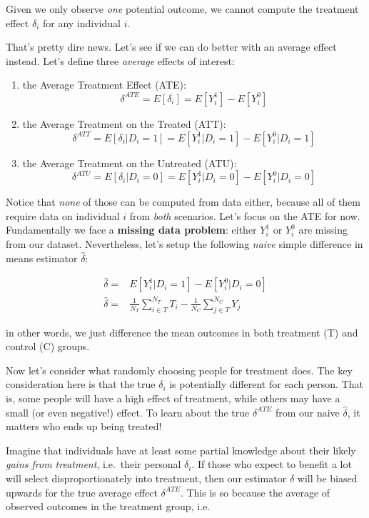 \documentclass[]{book}
\providecommand{\tightlist}{%
  \setlength{\itemsep}{0pt}\setlength{\parskip}{0pt}}
\newenvironment{warning}{\begin{tcolorbox}[colback=orange!5!white,colframe=orange]}{\end{tcolorbox}}
\begin{document}
\begin{warning}
Given we only observe \emph{one} potential outcome, we cannot compute
the treatment effect \(\delta_i\) for any individual \(i\).
\end{warning}

 That's pretty dire news. Let's see if we can do better with an average
effect instead. Let's define three \emph{average} effects of interest:

\begin{enumerate}
\def\labelenumi{\arabic{enumi}.}
\tightlist
\item
  the Average Treatment Effect (ATE):
  \[\delta^{ATE} = E[\delta_i] = E[Y_i^1] - E[Y_i^0]\]
\item
  the Average Treatment on the Treated (ATT):
  \[\delta^{ATT} = E[\delta_i|D_i = 1] = E[Y_i^1|D_i = 1] - E[Y_i^0|D_i = 1]\]
\item
  the Average Treatment on the Untreated (ATU):
  \[\delta^{ATU} = E[\delta_i|D_i = 0] = E[Y_i^1|D_i = 0] - E[Y_i^0|D_i = 0]\]
\end{enumerate}

Notice that \emph{none} of those can be computed from data either,
because all of them require data on individual \(i\) from \emph{both}
scenarios. Let's focus on the ATE for now. Fundamentally we face a
\textbf{missing data problem}: either \(Y_i^1\) or \(Y_i^0\) are missing
from our dataset. Nevertheless, let's setup the following \emph{naive}
simple difference in means estimator \(\hat{\delta}\):

\begin{align}
\hat{\delta} =& E[Y_i^1|D_i = 1] - E[Y_i^0|D_i = 0]\\
\hat{\delta} =& \frac{1}{N_T} \sum_{i \in T}^{N_T} T_i - \frac{1}{N_C} \sum_{j \in T}^{N_C} Y_j \label{eq:SDO}
\end{align}

in other words, we just difference the mean outcomes in both treatment
(T) and control (C) groups.

Now let's consider what randomly choosing people for treatment does. The
key consideration here is that the true \(\delta_i\) is potentially
different for each person. That is, some people will have a high effect
of treatment, while others may have a small (or even negative!) effect.
To learn about the true \(\delta^{ATE}\) from our naive
\(\hat{\delta}\), it matters who ends up being treated!

Imagine that individuals have at least some partial knowledge about
their likely \emph{gains from treatment}, i.e.~their personal
\(\delta_i\). If those who expect to benefit a lot will select
disproportionately into treatment, then our estimator \(\hat{\delta}\)
will be biased upwards for the true average effect \(\delta^{ATE}\).
This is so because the average of observed outcomes in the treatment
group, i.e.
\end{document}
